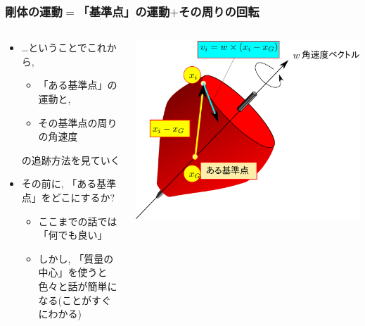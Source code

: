 \documentclass[10pt,dvipdfmx]{beamer}
\newcommand{\aka}[1]{{\color{red}#1}}
\begin{document}
\begin{frame}
\frametitle{剛体の運動$=$「基準点」の運動$+$その周りの回転}

\begin{columns}
\begin{column}{0.6\textwidth}
\begin{itemize}
\item \ldots ということでこれから,
\begin{itemize}
\item \aka{「ある基準点」の運動}と,
\item \aka{その基準点の周りの角速度}
\end{itemize}
の追跡方法を見ていく

\item その前に, 「ある基準点」をどこにするか?
\begin{itemize}
\item ここまでの話では「何でも良い」
\item しかし, 「質量の中心」を使うと色々と話が簡単になる(ことがすぐにわかる)
\end{itemize}
\end{itemize}
\end{column}

\begin{column}{0.4\textwidth}
  \includegraphics[width=\textwidth]{out/pdf/svg/v_w_r.pdf}
\end{column}
\end{columns}

\end{frame}
\end{document}
